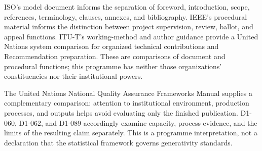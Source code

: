 \documentclass[11pt,a4paper]{article}
\begin{document}
ISO's model document informs the separation of foreword, introduction, scope, references, terminology, clauses, annexes, and bibliography. IEEE's procedural material informs the distinction between project supervision, review, ballot, and appeal functions. ITU-T's working-method and author guidance provide a United Nations system comparison for organized technical contributions and Recommendation preparation. These are comparisons of document and procedural functions; this programme has neither those organizations' constituencies nor their institutional powers.

The United Nations National Quality Assurance Frameworks Manual supplies a complementary comparison: attention to institutional environment, production processes, and outputs helps avoid evaluating only the finished publication. D1-060, D1-062, and D1-089 accordingly examine capacity, process evidence, and the limits of the resulting claim separately. This is a programme interpretation, not a declaration that the statistical framework governs generativity standards.


\GSPbibliography
\end{document}
